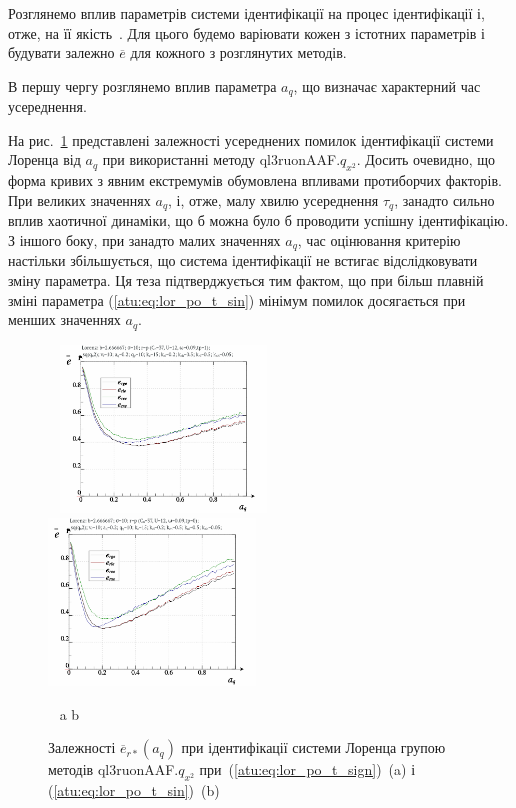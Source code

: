 Розглянемо вплив параметрів системи ідентифікації на процес
ідентифікації і, отже, на її якість~\cite{atu_ISDMCI2014}. Для цього будемо
варіювати кожен з істотних параметрів і будувати залежно
$ \overline{e} $ для кожного з розглянутих методів.

В першу чергу розглянемо вплив параметра
$a_q$, що визначає характерний час усереднення.

На рис.~\ref{atu:f:lor_a_q_ql3ruonAAF.q_x2} представлені залежності усереднених
помилок ідентифікації системи Лоренца від
$ a_q $ при використанні методу
ql3ruonAAF.$q_{x^2}$.
Досить очевидно, що форма кривих з явним екстремумів обумовлена
впливами протиборчих факторів. При великих значеннях
$a_q$, і, отже, малу хвилю усереднення
$ \tau_q $, занадто сильно вплив хаотичної динаміки, що б можна було
б проводити успішну ідентифікацію. З іншого боку, при занадто
малих значеннях
$a_q$, час оцінювання критерію настільки збільшується, що система
ідентифікації не встигає відслідковувати зміну параметра. Ця
теза підтверджується тим фактом, що при більш плавній зміні
параметра (\ref{atu:eq:lor_po_t_sin}) мінімум помилок досягається при
менших значеннях
$a_q$.

\begin{figure}[ht!]
  \begin{center}
    ~ \hfill
    \includegraphics[width=0.49\textwidth]{p/cha/lor/ql3ruonAAF/lor_ql3ruonAAF_qx2-p_a_q_e_sign.png}
    \hfill
    \includegraphics[width=0.49\textwidth]{p/cha/lor/ql3ruonAAF/lor_ql3ruonAAF_qx2-p_a_q_e_sin.png}
    \hfill ~
  \end{center}
  \vspace{-1.0ex}
  \begin{center}
    ~ \hfill a \hfill\hfill b \hfill ~
  \end{center}
  \vspace{-1.5ex}
  \caption{Залежності $ \overline{e}_{r *} (a_q) $ при ідентифікації системи Лоренца групою методів ql3ruonAAF.$q_{x^2} $ при~(\ref{atu:eq:lor_po_t_sign})~(a) і (\ref{atu:eq:lor_po_t_sin})~(b)}
  \label{atu:f:lor_a_q_ql3ruonAAF.q_x2}
\end{figure}


